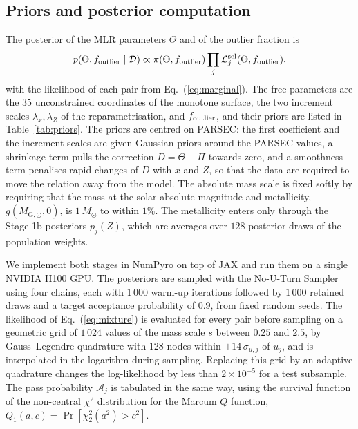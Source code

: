 \documentclass{aa}
\newcommand{\msun}{M_{\odot}}
\begin{document}
\subsection{Priors and posterior computation}\label{sec:inference}
The posterior of the MLR parameters $\Theta$ and of the outlier fraction is
\begin{equation}
 p(\Theta,f_{\rm outlier}\mid\mathcal D)\propto\pi(\Theta,f_{\rm outlier})\prod_j\mathcal L^{\rm sel}_j(\Theta,f_{\rm outlier}),
 \label{eq:posterior}
\end{equation}
with the likelihood of each pair from Eq.~(\ref{eq:marginal}). The free parameters are the $35$ unconstrained coordinates of the monotone surface, the two increment scales $\lambda_x,\lambda_Z$ of the reparametrisation, and $f_{\rm outlier}$, and their priors are listed in Table~\ref{tab:priors}. The priors are centred on PARSEC: the first coefficient and the increment scales are given Gaussian priors around the PARSEC values, a shrinkage term pulls the correction $D=\Theta-\Pi$ towards zero, and a smoothness term penalises rapid changes of $D$ with $x$ and $Z$, so that the data are required to move the relation away from the model. The absolute mass scale is fixed softly by requiring that the mass at the solar absolute magnitude and metallicity, $g(M_{\mathrm{G},\odot},0)$, is $1\,\msun$ to within $1\%$. The metallicity enters only through the Stage-1b posteriors $p_j(Z)$, which are averages over $128$ posterior draws of the population weights.

We implement both stages in NumPyro \citep{Phan2019NumPyro} on top of JAX \citep{Bradbury2018JAX} and run them on a single NVIDIA H100 GPU. The posteriors are sampled with the No-U-Turn Sampler \citep{HoffmanGelman2014NUTS} using four chains, each with $1\,000$ warm-up iterations followed by $1\,000$ retained draws and a target acceptance probability of $0.9$, from fixed random seeds. The likelihood of Eq.~(\ref{eq:mixture}) is evaluated for every pair before sampling on a geometric grid of $1\,024$ values of the mass scale $s$ between $0.25$ and $2.5$, by Gauss--Legendre quadrature with $128$ nodes within $\pm14\,\sigma_{u,j}$ of $u_j$, and is interpolated in the logarithm during sampling. Replacing this grid by an adaptive quadrature changes the log-likelihood by less than $2\times10^{-5}$ for a test subsample. The pass probability $\mathcal A_j$ is tabulated in the same way, using the survival function of the non-central $\chi^2$ distribution for the Marcum $Q$ function, $Q_1(a,c)=\Pr[\chi^2_2(a^2)>c^2]$.
\end{document}

